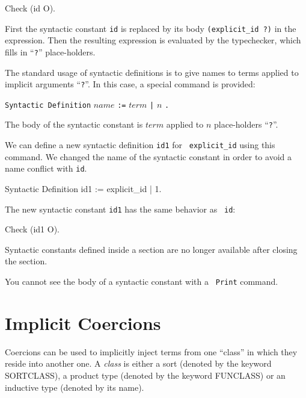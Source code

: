 \begin{coq_example}
Check (id O).
\end{coq_example}

\noindent First the syntactic constant {\tt id} is replaced by its
body {\tt (explicit\_id ?)} in the expression. Then the resulting
expression is evaluated by the typechecker, which fills in
``\verb+?+'' place-holders.

The standard usage of syntactic definitions is to give names to terms
applied to implicit arguments ``\verb+?+''. In this case, a special
command is provided:

\begin{center}
\verb+Syntactic Definition+ $name$ \verb+:=+ $term$ \verb+|+ $n$ \verb+.+ \\
\end{center}

\noindent The body of the syntactic constant is $term$ applied to $n$
place-holders ``\verb+?+''.

We can define a new syntactic definition {\tt id1} for {\tt
  explicit\_id} using this command. We changed the name of the
syntactic constant in order to avoid a name conflict with {\tt id}.

\begin{coq_example}
Syntactic Definition id1 := explicit_id | 1.
\end{coq_example}

The new syntactic constant {\tt id1} has the same behavior as {\tt
  id}:

\begin{coq_example}
Check (id1 O).
\end{coq_example}


\begin{Warnings}
\item Syntactic constants defined inside a section are no longer
  available after closing the section.
\item You cannot see the body of a syntactic constant with a {\tt
    Print} command.
\end{Warnings}

\section{Implicit Coercions}
\label{Coercions}

Coercions can be used to implicitly inject terms from one ``class'' in
which they reside into another one. A {\em class} is either a sort
(denoted by the keyword SORTCLASS), a product type (denoted by the
keyword FUNCLASS) or an inductive type (denoted by its name).

